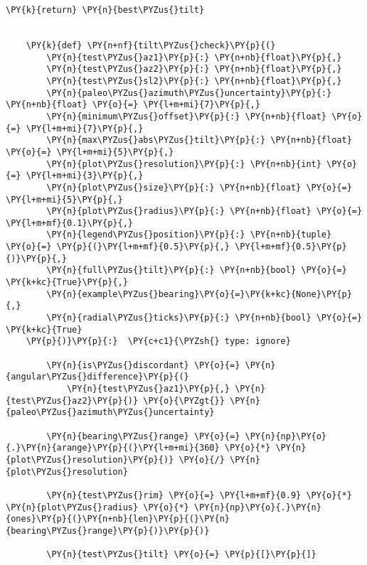 \begin{tcolorbox}[breakable, size=fbox, boxrule=1pt, pad at break*=1mm,colback=cellbackground, colframe=cellborder]
\begin{Verbatim}[commandchars=\\\{\}]
        \PY{k}{return} \PY{n}{best\PYZus{}tilt}
    
    
    \PY{k}{def} \PY{n+nf}{tilt\PYZus{}check}\PY{p}{(}
        \PY{n}{test\PYZus{}az1}\PY{p}{:} \PY{n+nb}{float}\PY{p}{,}
        \PY{n}{test\PYZus{}az2}\PY{p}{:} \PY{n+nb}{float}\PY{p}{,}
        \PY{n}{test\PYZus{}sl2}\PY{p}{:} \PY{n+nb}{float}\PY{p}{,}
        \PY{n}{paleo\PYZus{}azimuth\PYZus{}uncertainty}\PY{p}{:} \PY{n+nb}{float} \PY{o}{=} \PY{l+m+mi}{7}\PY{p}{,}
        \PY{n}{minimum\PYZus{}offset}\PY{p}{:} \PY{n+nb}{float} \PY{o}{=} \PY{l+m+mi}{7}\PY{p}{,}
        \PY{n}{max\PYZus{}abs\PYZus{}tilt}\PY{p}{:} \PY{n+nb}{float} \PY{o}{=} \PY{l+m+mi}{5}\PY{p}{,}
        \PY{n}{plot\PYZus{}resolution}\PY{p}{:} \PY{n+nb}{int} \PY{o}{=} \PY{l+m+mi}{3}\PY{p}{,}
        \PY{n}{plot\PYZus{}size}\PY{p}{:} \PY{n+nb}{float} \PY{o}{=} \PY{l+m+mi}{5}\PY{p}{,}
        \PY{n}{plot\PYZus{}radius}\PY{p}{:} \PY{n+nb}{float} \PY{o}{=} \PY{l+m+mf}{0.1}\PY{p}{,}
        \PY{n}{legend\PYZus{}position}\PY{p}{:} \PY{n+nb}{tuple} \PY{o}{=} \PY{p}{(}\PY{l+m+mf}{0.5}\PY{p}{,} \PY{l+m+mf}{0.5}\PY{p}{)}\PY{p}{,}
        \PY{n}{full\PYZus{}tilt}\PY{p}{:} \PY{n+nb}{bool} \PY{o}{=} \PY{k+kc}{True}\PY{p}{,}
        \PY{n}{example\PYZus{}bearing}\PY{o}{=}\PY{k+kc}{None}\PY{p}{,}
        \PY{n}{radial\PYZus{}ticks}\PY{p}{:} \PY{n+nb}{bool} \PY{o}{=} \PY{k+kc}{True}
    \PY{p}{)}\PY{p}{:}  \PY{c+c1}{\PYZsh{} type: ignore}
    
        \PY{n}{is\PYZus{}discordant} \PY{o}{=} \PY{n}{angular\PYZus{}difference}\PY{p}{(}
            \PY{n}{test\PYZus{}az1}\PY{p}{,} \PY{n}{test\PYZus{}az2}\PY{p}{)} \PY{o}{\PYZgt{}} \PY{n}{paleo\PYZus{}azimuth\PYZus{}uncertainty}
    
        \PY{n}{bearing\PYZus{}range} \PY{o}{=} \PY{n}{np}\PY{o}{.}\PY{n}{arange}\PY{p}{(}\PY{l+m+mi}{360} \PY{o}{*} \PY{n}{plot\PYZus{}resolution}\PY{p}{)} \PY{o}{/} \PY{n}{plot\PYZus{}resolution}
    
        \PY{n}{test\PYZus{}rim} \PY{o}{=} \PY{l+m+mf}{0.9} \PY{o}{*} \PY{n}{plot\PYZus{}radius} \PY{o}{*} \PY{n}{np}\PY{o}{.}\PY{n}{ones}\PY{p}{(}\PY{n+nb}{len}\PY{p}{(}\PY{n}{bearing\PYZus{}range}\PY{p}{)}\PY{p}{)}
    
        \PY{n}{test\PYZus{}tilt} \PY{o}{=} \PY{p}{[}\PY{p}{]}
    

\end{Verbatim}
\end{tcolorbox}
